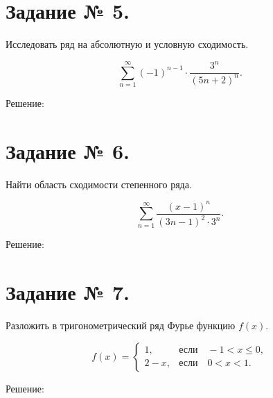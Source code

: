 \documentclass{article}
\renewcommand{\leq}{\ensuremath{\leqslant}}
\begin{document}
\section*{Задание № 5.}

Исследовать ряд на абсолютную и условную сходимость.

$$\sum\limits_{n=1}^{\infty}(-1)^{n-1}\cdot\frac{3^n}{(5n+2)^n}.$$

\begin{center}Решение:\end{center}

\section*{Задание № 6.}

Найти область сходимости степенного ряда.

$$\sum\limits_{n=1}^{\infty}\frac{(x-1)^n}{(3n-1)^2\cdot3^n}.$$

\begin{center}Решение:\end{center}

\section*{Задание № 7.}

Разложить в тригонометрический ряд Фурье функцию $f(x)$.

\begin{equation*}
f(x)=
 \begin{cases}
  1, & \textit{если}\quad -1<x\leq0,\\
  2-x, & \textit{если}\quad 0<x<1.
 \end{cases}
\end{equation*}

\begin{center}Решение:\end{center}
\end{document}
